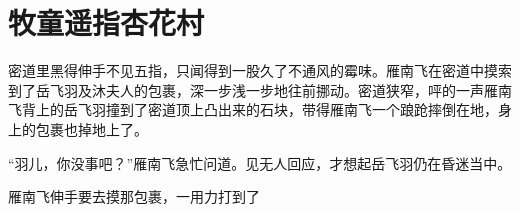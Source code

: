 
\chapter{牧童遥指杏花村}
\label{chap:mu-tong-yao-zhi-xing-hua-cun}

密道里黑得伸手不见五指，只闻得到一股久了不通风的霉味。雁南飞在密道中摸索到了岳飞羽及沐夫人的包裹，深一步浅一步地往前挪动。密道狭窄，呯的一声雁南飞背上的岳飞羽撞到了密道顶上凸出来的石块，带得雁南飞一个踉跄摔倒在地，身上的包裹也掉地上了。

“羽儿，你没事吧？”雁南飞急忙问道。见无人回应，才想起岳飞羽仍在昏迷当中。

雁南飞伸手要去摸那包裹，一用力打到了

